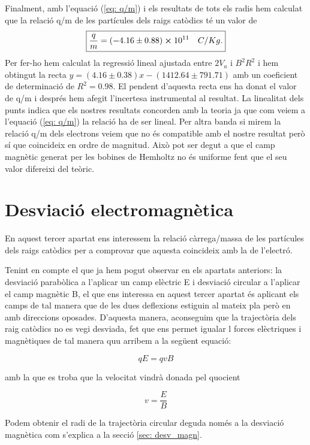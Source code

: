 \documentclass[11pt]{article}
\begin{document}
Finalment, amb l'equació (\ref{eq: q/m}) i els resultats de tots els radis hem calculat que la relació q/m de les partícules dels raigs catòdics té un valor de 
\[
\boxed{\frac{q}{m}=(-4.16\pm0.88)\cross10^{11}\quad C/Kg.}
\]
Per fer-ho hem calculat la regressió lineal ajustada entre $2V_a$ i $B^2R^2$ i hem obtingut la recta $y=(4.16\pm0.38)x - (1412.64\pm791.71)$ amb un coeficient de determinació de $R^2=0.98$. El pendent d'aquesta recta ens ha donat el valor de q/m i després hem afegit l'incertesa instrumental al resultat. La linealitat dels punts indica que els nostres resultats concorden amb la teoria ja que com veiem a l'equació (\ref{eq: q/m}) la relació ha de ser lineal. Per altra banda si mirem la relació q/m dels electrons veiem que no és compatible amb el nostre resultat però sí que coincideix en ordre de magnitud. Això pot ser degut a que el camp magnètic generat per les bobines de Hemholtz no és uniforme fent que el seu valor difereixi del teòric.


\section{Desviació electromagnètica}\label{sec: desv_em}

En aquest tercer apartat ens interessem la relació càrrega/massa de les partícules dels raigs catòdics per a comprovar que aquesta coincideix amb la de l'electró. 

Tenint en compte el que ja hem pogut observar en els apartats anteriors: la desviació parabòlica a l'aplicar un camp elèctric E i desviació circular a l'aplicar el camp magnètic B, el que ens interessa en aquest tercer apartat és aplicant els camps de tal manera que de les dues deflexions estiguin al mateix pla però en amb direccions oposades. D'aquesta manera, aconseguim que la trajectòria dels raig catòdics no es vegi desviada, fet que ens permet igualar l forces elèctriques i magnètiques de tal manera quu arribem a la següent equació:

\begin{equation}\label{eq: Fm=Fe}
    qE = qvB
\end{equation}

amb la que es troba que la velocitat vindrà donada pel quocient

\begin{equation}
    v = \frac{E}{B}
\end{equation}

Podem obtenir el radi de la trajectòria circular deguda només a la desviació magnètica com s'explica a la secció \ref{sec: desv_magn}.
\end{document}
